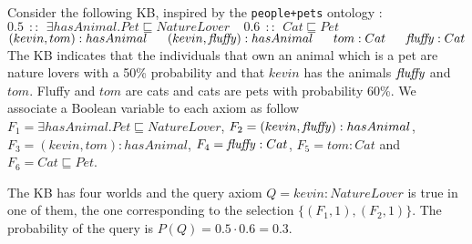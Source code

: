 \begin{example}
\label{people+petsxy}
\begin{small}
Consider the following KB, inspired by the \texttt{people+pets} ontology  \cite{ISWC03-tut}:
{\center $0.5\ \ ::\ \ \exists hasAnimal.Pet \sqsubseteq NatureLover\ \ \ \ \ 0.6\ \ ::\ \ Cat\sqsubseteq Pet$\\
$(kevin,tom):hasAnimal\ \ \ \ \ (kevin,\fluffy):hasAnimal\ \ \ \ \ tom: Cat\ \ \ \ \ \fluffy: Cat$\\}
\noindent The KB indicates that the individuals that own an animal which is a pet are nature lovers with a 50\% probability and that $kevin$ has the animals 
${\mathit{fluffy}}$ and $tom$.  Fluffy and $tom$ are cats and cats are pets with probability 60\%.
We associate a Boolean variable to each axiom as follow
$F_1 = \exists hasAnimal.Pet \sqsubseteq NatureLover$, $F_2=(kevin,{\mathit{fluffy}}):hasAnimal$, $F_3=(kevin,tom):hasAnimal$, $F_4={\mathit{fluffy}}: Cat$, $F_5=tom: Cat$ and $F_6= Cat\sqsubseteq Pet$.


The KB has four worlds and the query axiom $Q=kevin:NatureLover$ is true in one of them, the one corresponding to the selection 
$
\{(F_1,1),(F_2,1)\}
$.
The probability of the query is $P(Q)=0.5\cdot 0.6=0.3$.
\end{small}
\end{example}

